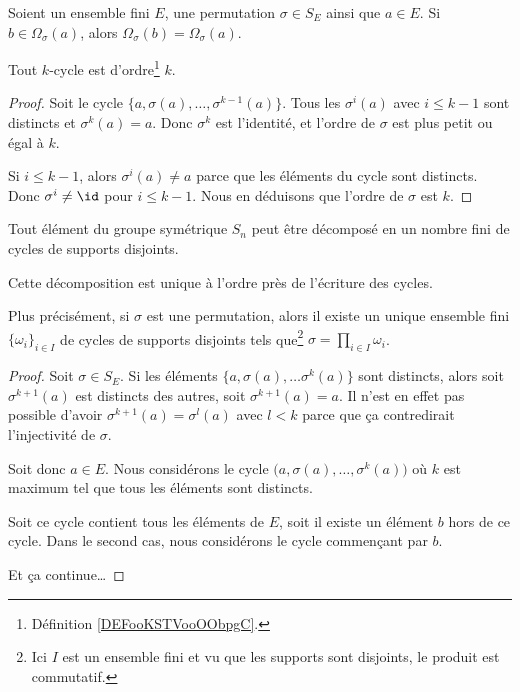 \begin{lemma}       \label{LEMooMIHGooQfALbc}
	Soient un ensemble fini \( E\), une permutation \( \sigma\in S_E\) ainsi que \( a\in E\). Si \( b\in \Omega_{\sigma}(a)\), alors \( \Omega_{\sigma}(b)=\Omega_{\sigma}(a)\).
\end{lemma}


\begin{lemma}
	Tout \( k\)-cycle est d'ordre\footnote{Définition \ref{DEFooKSTVooOObpgC}.} \( k\).
\end{lemma}

\begin{proof}
	Soit le cycle \( \{ a,\sigma(a),\ldots, \sigma^{k-1}(a) \}\). Tous les \( \sigma^i(a)\) avec \( i\leq k-1\) sont distincts et \( \sigma^k(a)=a\). Donc \( \sigma^k\) est l'identité, et l'ordre de \( \sigma\) est plus petit ou égal à \( k\).

	Si \( i\leq k-1\), alors \( \sigma^i(a)\neq a\) parce que les éléments du cycle sont distincts. Donc \( \sigma^i\neq \id\) pour \( i\leq k-1\). Nous en déduisons que l'ordre de \( \sigma\) est \( k\).
\end{proof}


\begin{lemma}       \label{LEMooQLSAooBrXDXw}
	Tout élément du groupe symétrique \( S_n\) peut être décomposé en un nombre fini de cycles de supports disjoints.

	Cette décomposition est unique à l'ordre près de l'écriture des cycles.

	Plus précisément, si \( \sigma\) est une permutation, alors il existe un unique ensemble fini \( \{ \omega_i \}_{i\in I}\) de cycles de supports disjoints tels que\footnote{Ici \( I\) est un ensemble fini et vu que les supports sont disjoints, le produit est commutatif.} \( \sigma=\prod_{i\in I}\omega_i\).
\end{lemma}

\begin{proof}
	Soit \( \sigma\in S_E\). Si les éléments \( \{ a,\sigma(a), \ldots \sigma^k(a)\}\) sont distincts, alors soit \( \sigma^{k+1}(a)\) est distincts des autres, soit \( \sigma^{k+1}(a)=a\). Il n'est en effet pas possible d'avoir \( \sigma^{k+1}(a)=\sigma^l(a)\) avec \( l<k\) parce que ça contredirait l'injectivité de \( \sigma\).

	Soit donc \( a\in E\). Nous considérons le cycle \( \big( a,\sigma(a),\ldots, \sigma^k(a) \big)\) où \( k\) est maximum tel que tous les éléments sont distincts.

	Soit ce cycle contient tous les éléments de \( E\), soit il existe un élément \( b\) hors de ce cycle. Dans le second cas, nous considérons le cycle commençant par \( b\).

	Et ça continue\ldots
\end{proof}


